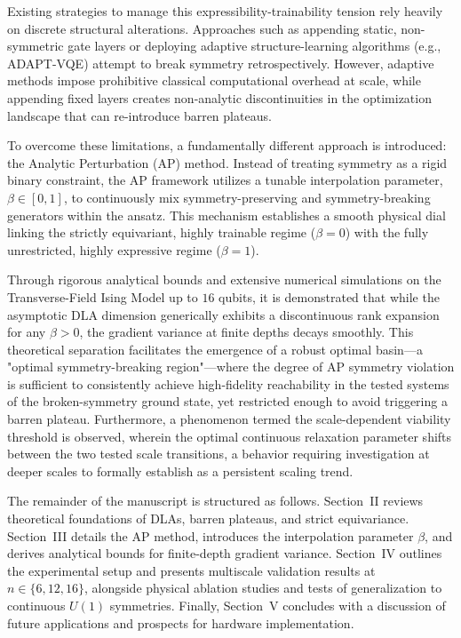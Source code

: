\documentclass[pdflatex,sn-mathphys-num]{sn-jnl}
\theoremstyle{thmstyleone}
\theoremstyle{thmstyletwo}
\theoremstyle{thmstylethree}
\begin{document}
Existing strategies to manage this expressibility-trainability tension rely heavily on discrete structural alterations. Approaches such as appending static, non-symmetric gate layers or deploying adaptive structure-learning algorithms (e.g., ADAPT-VQE) attempt to break symmetry retrospectively. However, adaptive methods impose prohibitive classical computational overhead at scale, while appending fixed layers creates non-analytic discontinuities in the optimization landscape that can re-introduce barren plateaus.

To overcome these limitations, a fundamentally different approach is introduced: the Analytic Perturbation (AP) method. Instead of treating symmetry as a rigid binary constraint, the AP framework utilizes a tunable interpolation parameter, $\beta \in [0, 1]$, to continuously mix symmetry-preserving and symmetry-breaking generators within the ansatz. This mechanism establishes a smooth physical dial linking the strictly equivariant, highly trainable regime ($\beta=0$) with the fully unrestricted, highly expressive regime ($\beta=1$).

Through rigorous analytical bounds and extensive numerical simulations on the Transverse-Field Ising Model up to $16$ qubits, it is demonstrated that while the asymptotic DLA dimension generically exhibits a discontinuous rank expansion for any $\beta > 0$, the gradient variance at finite depths decays smoothly. This theoretical separation facilitates the emergence of a robust optimal basin---a "optimal symmetry-breaking region"---where the degree of AP symmetry violation is sufficient to consistently achieve high-fidelity reachability in the tested systems of the broken-symmetry ground state, yet restricted enough to avoid triggering a barren plateau. Furthermore, a phenomenon termed the scale-dependent viability threshold is observed, wherein the optimal continuous relaxation parameter shifts between the two tested scale transitions, a behavior requiring investigation at deeper scales to formally establish as a persistent scaling trend.

The remainder of the manuscript is structured as follows. Section~II reviews theoretical foundations of DLAs, barren plateaus, and strict equivariance. Section~III details the AP method, introduces the interpolation parameter $\beta$, and derives analytical bounds for finite-depth gradient variance. Section~IV outlines the experimental setup and presents multiscale validation results at $n \in \{6, 12, 16\}$, alongside physical ablation studies and tests of generalization to continuous $U(1)$ symmetries. Finally, Section~V concludes with a discussion of future applications and prospects for hardware implementation.
\end{document}
